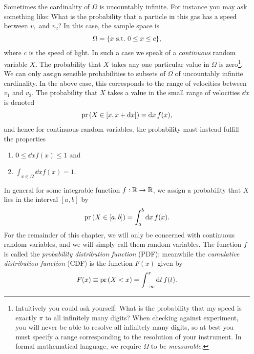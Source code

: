 Sometimes the cardinality of $\Omega$ is uncountably infinite. For instance you
may ask something like: What is the probability that a particle in this gas has
a speed between $v_1$ and $v_2$? In this case, the sample space is
\begin{equation}
  \Omega=\{x~\text{s.t.}~0\leq x\leq c\},
\end{equation}
where $c$ is the speed of light.
In such a case we speak of a {\it continuous} random variable $X$.
The probability that $X$ takes any one particular value in $\Omega$ is
zero\footnote{Intuitively you could ask yourself: What is the probability that
my speed is exactly $\pi$ to all infinitely many digits? When checking against
experiment, you will never be able to resolve all infinitely many digits, so at
best you must specify a range corresponding to the resolution of your
instrument. In formal mathematical language, we require $\Omega$ to be
{\it measurable}.}.
We can only assign
sensible probabilities to subsets of $\Omega$ of uncountably infinite
cardinality. In the above
case, this corresponds to the range of velocities between $v_1$ and $v_2$.
The probability that $X$ takes a value in the small range of velocities $\dd x$
is denoted
\begin{equation}
   \pr{X\in[x,x+\dd x]}=\dd{x}f(x),
\end{equation}
and hence for continuous random variables, the probability must instead
fulfill the properties
\begin{enumerate}
  \item  $0\leq\dd{x}f(x)\leq 1$ and
  \item $\int_{x\in\Omega}\dd{x}f(x)=1$.
\end{enumerate}
In general for some integrable function 
$f:\mathbb{R}\to\mathbb{R}$, we assign a 
probability that $X$ lies in the interval $[a,b]$ by
\begin{equation}
  \label{eq:cpr}
  \pr{X\in[a,b]}=\int_a^b\dd{x}f(x).
\end{equation}
For the remainder of this chapter, we will
only be concerned with continuous random variables, and we will simply call
them random variables.
The function $f$ is called the {\it probability distribution function} 
(PDF); meanwhile the {\it cumulative distribution function} 
(CDF) is the function $F(x)$ given by
\begin{equation}
  F(x)\equiv \pr{X<x}=\int_{-\infty}^x\dd{t}f(t).
\end{equation}
